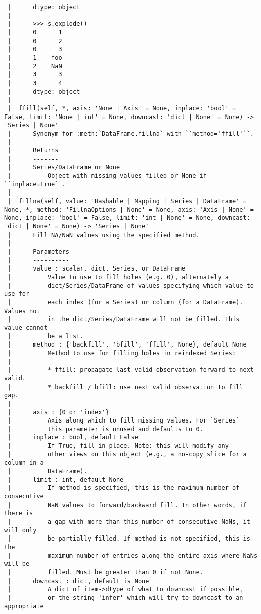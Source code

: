 \documentclass[
  letterpaper,
  DIV=11,
  numbers=noendperiod]{scrreprt}
\begin{document}
\begin{verbatim}
 |      dtype: object
 |      
 |      >>> s.explode()
 |      0      1
 |      0      2
 |      0      3
 |      1    foo
 |      2    NaN
 |      3      3
 |      3      4
 |      dtype: object
 |  
 |  ffill(self, *, axis: 'None | Axis' = None, inplace: 'bool' = False, limit: 'None | int' = None, downcast: 'dict | None' = None) -> 'Series | None'
 |      Synonym for :meth:`DataFrame.fillna` with ``method='ffill'``.
 |      
 |      Returns
 |      -------
 |      Series/DataFrame or None
 |          Object with missing values filled or None if ``inplace=True``.
 |  
 |  fillna(self, value: 'Hashable | Mapping | Series | DataFrame' = None, *, method: 'FillnaOptions | None' = None, axis: 'Axis | None' = None, inplace: 'bool' = False, limit: 'int | None' = None, downcast: 'dict | None' = None) -> 'Series | None'
 |      Fill NA/NaN values using the specified method.
 |      
 |      Parameters
 |      ----------
 |      value : scalar, dict, Series, or DataFrame
 |          Value to use to fill holes (e.g. 0), alternately a
 |          dict/Series/DataFrame of values specifying which value to use for
 |          each index (for a Series) or column (for a DataFrame).  Values not
 |          in the dict/Series/DataFrame will not be filled. This value cannot
 |          be a list.
 |      method : {'backfill', 'bfill', 'ffill', None}, default None
 |          Method to use for filling holes in reindexed Series:
 |      
 |          * ffill: propagate last valid observation forward to next valid.
 |          * backfill / bfill: use next valid observation to fill gap.
 |      
 |      axis : {0 or 'index'}
 |          Axis along which to fill missing values. For `Series`
 |          this parameter is unused and defaults to 0.
 |      inplace : bool, default False
 |          If True, fill in-place. Note: this will modify any
 |          other views on this object (e.g., a no-copy slice for a column in a
 |          DataFrame).
 |      limit : int, default None
 |          If method is specified, this is the maximum number of consecutive
 |          NaN values to forward/backward fill. In other words, if there is
 |          a gap with more than this number of consecutive NaNs, it will only
 |          be partially filled. If method is not specified, this is the
 |          maximum number of entries along the entire axis where NaNs will be
 |          filled. Must be greater than 0 if not None.
 |      downcast : dict, default is None
 |          A dict of item->dtype of what to downcast if possible,
 |          or the string 'infer' which will try to downcast to an appropriate

\end{verbatim}
\end{document}
